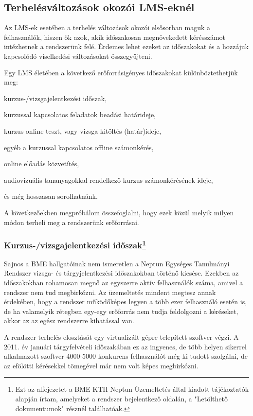 \subsection{Terhelésváltozások okozói LMS-eknél}

Az LMS-ek esetében a terhelés változások okozói elsősorban maguk a felhasználók, hiszen ők azok, akik időszakosan megnövekedett kérésszámot intézhetnek a rendszerünk felé. Érdemes lehet ezeket az időszakokat és a hozzájuk kapcsolódó viselkedési változásokat összegyűjteni.

Egy LMS életében a következő erőforrásigényes időszakokat különböztethetjük meg:
\begin{sajat_itemize}
\item kurzus-/vizsgajelentkezési időszak,
\item kurzussal kapcsolatos feladatok beadási határideje,
\item kurzus online teszt, vagy vizsga kitöltés (határ)ideje,
\item egyéb a kurzussal kapcsolatos offline számonkérés,
\item online előadás közvetítés,
\item audiovizuális tananyagokkal rendelkező kurzus számonkérésének ideje, 
\end{sajat_itemize}
és még hosszasan sorolhatnánk.

A következőekben megpróbálom összefoglalni, hogy ezek közül melyik milyen módon terheli meg a rendszerünk erőforrásai.

\subsubsection{Kurzus-/vizsgajelentkezési időszak\protect\footnote{Ezt az alfejezetet a BME KTH Neptun Üzemeltetés által kiadott tájékoztatók alapján írtam, amelyeket a rendszer bejelentkező oldalán, a "Letölthető dokumentumok" résznél találhatóak.}}

Sajnos a BME hallgatóinak nem ismeretlen a Neptun Egységes Tanulmányi Rendszer vizsga- és tárgyjelentkezési időszakokban történő kiesése. Ezekben az időszakokban rohamosan megnő az egyszerre aktív felhasználók száma, amivel a rendszer nem tud megbirkózni. Az üzemeltetés mindent megtesz annak érdekében, hogy a rendszer működőképes legyen a több ezer felhasználó esetén is, de ha valamelyik rétegben egy-egy erőforrás nem tudja feldolgozni a kéréseket, akkor az az egész rendszerre kihatással van.

A rendszer terhelés elosztását egy virtualizált gépre telepített szoftver végzi. A 2011. év januári tárgyfelvételi időszakában ez az ingyenes, de több helyen sikerrel alkalmazott szoftver 4000-5000 konkurens felhasználót még ki tudott szolgálni, de az efölötti kérésekkel tömegével már nem volt képes megbirkózni.

